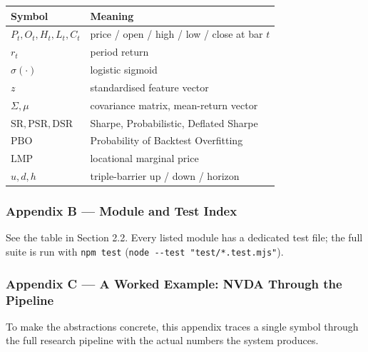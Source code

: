 \documentclass[
  11pt,
]{article}
\newcounter{none} %
\begin{document}
{\def\LTcaptype{none} %
\begin{longtable}[]{@{}
  >{\raggedright\arraybackslash}p{}
  >{\raggedright\arraybackslash}p{}@{}}
\toprule\noalign{}
\begin{minipage}[b]{\linewidth}\raggedright
Symbol
\end{minipage} & \begin{minipage}[b]{\linewidth}\raggedright
Meaning
\end{minipage} \\
\midrule\noalign{}
\endhead
\bottomrule\noalign{}
\endlastfoot
\(P_t, O_t, H_t, L_t, C_t\) & price / open / high / low / close at bar
\(t\) \\
\(r_t\) & period return \\
\(\sigma(\cdot)\) & logistic sigmoid \\
\(z\) & standardised feature vector \\
\(\Sigma, \mu\) & covariance matrix, mean-return vector \\
\(\text{SR}, \text{PSR}, \text{DSR}\) & Sharpe, Probabilistic, Deflated
Sharpe \\
\(\text{PBO}\) & Probability of Backtest Overfitting \\
\(\text{LMP}\) & locational marginal price \\
\(u, d, h\) & triple-barrier up / down / horizon \\
\end{longtable}
}

\subsubsection{Appendix B --- Module and Test
Index}\label{appendix-b-module-and-test-index}

See the table in Section 2.2. Every listed module has a dedicated test
file; the full suite is run with \texttt{npm\ test}
(\texttt{node\ -\/-test\ "test/*.test.mjs"}).

\subsubsection{Appendix C --- A Worked Example: NVDA Through the
Pipeline}\label{appendix-c-a-worked-example-nvda-through-the-pipeline}

To make the abstractions concrete, this appendix traces a single symbol
through the full research pipeline with the actual numbers the system
produces.
\end{document}
